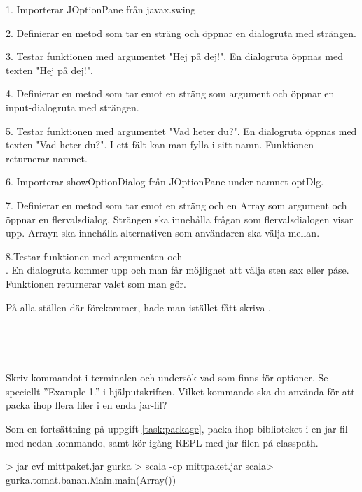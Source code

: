 1. Importerar JOptionPane från javax.swing

2. Definierar en metod som tar en sträng och öppnar en dialogruta med strängen.

3. Testar funktionen med argumentet "Hej på dej!". En dialogruta öppnas med texten "Hej på dej!".

4. Definierar en metod som tar emot en sträng som argument och öppnar en input-dialogruta med strängen.

5. Testar funktionen med argumentet "Vad heter du?". En dialogruta öppnas med texten "Vad heter du?". I ett fält kan man fylla i sitt namn. Funktionen returnerar namnet.

6. Importerar showOptionDialog från JOptionPane under namnet optDlg.

7. Definierar en metod som tar emot en sträng och en Array som argument och öppnar en flervalsdialog. Strängen ska innehålla frågan som flervalsdialogen visar upp. Arrayn ska innehålla alternativen som användaren ska välja mellan.

8.Testar funktionen med argumenten  och \\ . En dialogruta kommer upp och man får möjlighet att välja sten sax eller påse. Funktionen returnerar valet som man gör.

\SubtaskSolved  På alla ställen där  förekommer, hade man istället fått skriva .

\SubtaskSolved  -



\QUESTEND









\QUESTBEGIN

\Task  \what~

\Subtask Skriv kommandot  i terminalen och undersök vad som finns för optioner. Se speciellt ''Example 1.'' i hjälputskriften. Vilket kommando ska du använda för att packa ihop flera filer i en enda jar-fil?

\Subtask Som en fortsättning på uppgift \ref{task:package}, packa ihop biblioteket  i en jar-fil med nedan kommando, samt kör igång REPL med jar-filen på classpath.

\begin{REPL}
> jar cvf mittpaket.jar gurka
> scala -cp mittpaket.jar
scala> gurka.tomat.banan.Main.main(Array())
\end{REPL}


